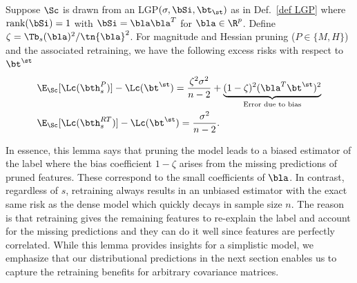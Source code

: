 \begin{lemma} Suppose $\Sc$ is drawn from an LGP$(\sigma,\bSi,\bt_\st)$ as in Def.~\ref{def LGP} where $\text{rank}(\bSi)=1$ with $\bSi=\bla\bla^T$ for $\bla\in\R^p$. Define $\zeta=\Tb_s(\bla)^2/\tn{\bla}^2$. For magnitude and Hessian pruning ($P\in\{M,H\}$) and the associated retraining, we have the following excess risks with respect to $\bt^\st$%
\begin{align}%
&\E_{\Sc}[\Lc(\bth_s^P)]-\Lc(\bt^\st)={\frac{\zeta^2\sigma^2}{n-2}}+\underbrace{(1-\zeta)^2(\bla^T\bt^\st)^2}_{\text{Error due to bias}}\\
&\E_{\Sc}[\Lc(\bth_s^{RT})]-\Lc(\bt^\st)=\frac{\sigma^2}{n-2}.
\end{align}
\end{lemma}
In essence, this lemma says that pruning the model leads to a biased estimator of the label where the bias coefficient $1-\zeta$ arises from the missing predictions of pruned features. These correspond to the small coefficients of $\bla$. In contrast, regardless of $s$, retraining always results in an unbiased estimator with the exact same risk as the dense model which quickly decays in sample size $n$. The reason is that retraining gives the remaining features to re-explain the label and account for the missing predictions and they can do it well since features are perfectly correlated. While this lemma provides insights for a simplistic model, we emphasize that our distributional predictions in the next section enables us to capture the retraining benefits for arbitrary covariance matrices.%
